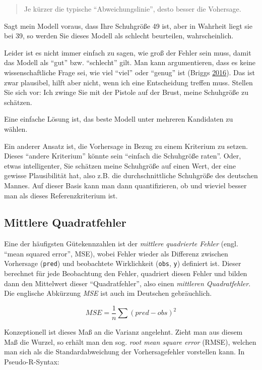 \documentclass[12pt,ngerman,]{book}
\theoremstyle{definition}
\theoremstyle{definition}
\theoremstyle{remark}
\begin{document}
\begin{quote}
Je kürzer die typische ``Abweichungslinie'', desto besser die Vohersage.
\end{quote}

Sagt mein Modell voraus, dass Ihre Schuhgröße 49 ist, aber in Wahrheit
liegt sie bei 39, so werden Sie dieses Modell als schlecht beurteilen,
wahrscheinlich.

Leider ist es nicht immer einfach zu sagen, wie groß der Fehler sein
muss, damit das Modell als ``gut'' bzw. ``schlecht'' gilt. Man kann
argumentieren, dass es keine wissenschaftliche Frage sei, wie viel
``viel'' oder ``genug'' ist (Briggs
\protect\hyperlink{ref-uncertainty}{2016}). Das ist zwar plausibel,
hilft aber nicht, wenn ich eine Entscheidung treffen muss. Stellen Sie
sich vor: Ich zwinge Sie mit der Pistole auf der Brust, meine Schuhgröße
zu schätzen.

Eine einfache Lösung ist, das beste Modell unter mehreren Kandidaten zu
wählen.

Ein anderer Ansatz ist, die Vorhersage in Bezug zu einem Kriterium zu
setzen. Dieses ``andere Kriterium'' könnte sein ``einfach die Schuhgröße
raten''. Oder, etwas intelligenter, Sie schätzen meine Schuhgröße auf
einen Wert, der eine gewisse Plausibilität hat, also z.B. die
durchschnittliche Schuhgröße des deutschen Mannes. Auf dieser Basis kann
man dann quantifizieren, ob und wieviel besser man als dieses
Referenzkriterium ist.

\subsection{Mittlere Quadratfehler}\label{mittlere-quadratfehler}

Eine der häufigsten Gütekennzahlen ist der \emph{mittlere quadrierte
Fehler} (engl. ``mean squared error'', MSE), wobei Fehler wieder als
Differenz zwischen Vorhersage (\texttt{pred}) und beobachtete
Wirklichkeit (\texttt{obs}, \texttt{y}) definiert ist. Dieser berechnet
für jede Beobachtung den Fehler, quadriert diesen Fehler und bilden dann
den Mittelwert dieser ``Quadratfehler'', also einen \emph{mittleren
Quadratfehler}. Die englische Abkürzung \emph{MSE} ist auch im Deutschen
gebräuchlich.

\[ MSE = \frac{1}{n} \sum{(pred - obs)^2} \]

Konzeptionell ist dieses Maß an die Varianz angelehnt. Zieht man aus
diesem Maß die Wurzel, so erhält man den sog. \emph{root mean square
error} (RMSE), welchen man sich als die Standardabweichung der
Vorhersagefehler vorstellen kann. In Pseudo-R-Syntax:
\end{document}

